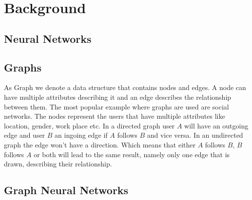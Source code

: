 \chapter{Background}

  \section{Neural Networks}


	\section{Graphs}

		As Graph we denote a data structure that contains nodes and edges. A node can have multiple attributes describing it and an edge describes the relationship between them. The most popular example where graphs are used are social networks. The nodes represent the users that have multiple attributes like location, gender, work place etc. In a directed graph user $A$ will have an outgoing edge and user $B$ an ingoing edge if $A$ follows $B$ and vice versa. In an undirected graph the edge won't have a direction. Which means that either $A$ follows $B$, $B$ follows $A$ or both will lead to the same result, namely only one edge that is drawn, describing their relationship.

	\section{Graph Neural Networks}
